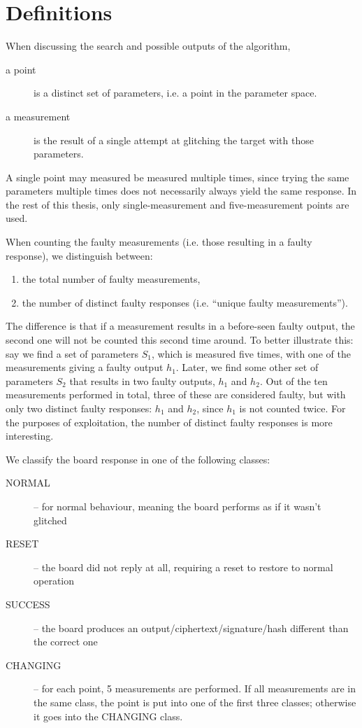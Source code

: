 \documentclass[times, utf8, diplomski]{fer}
\begin{document}
\section{Definitions}\label{sec:definitions}
When discussing the search and possible outputs of the algorithm,
\begin{description}
    \item[a point] is a distinct set of parameters, i.e. a point in the parameter space.
    \item[a measurement] is the result of a single attempt at glitching the target with those parameters.
\end{description}

A single point may measured be measured multiple times, since trying the same
parameters multiple times does not necessarily always yield the same response.
In the rest of this thesis, only single-measurement and five-measurement points
are used.

When counting the faulty measurements (i.e. those resulting in a faulty
response), we distinguish between:
\begin{enumerate}
    \item the total number of faulty measurements,
    \item the number of distinct faulty responses (i.e. ``unique faulty measurements'').
\end{enumerate}

The difference is that if a measurement results in a before-seen faulty output,
the second one will not be counted this second time around.
To better illustrate this: say we find a set of parameters $S_1$, which is
measured five times, with one of the measurements giving a faulty output $h_1$.
Later, we find some other set of parameters $S_2$ that results in two faulty
outputs, $h_1$ and $h_2$. Out of the ten measurements performed in total, three
of these are considered faulty, but with only two distinct faulty responses:
$h_1$ and $h_2$, since $h_1$ is not counted twice.
For the purposes of exploitation, the number of distinct faulty responses is
more interesting.

We classify the board response in one of the following classes:
\begin{description}
    \item[NORMAL]   -- for normal behaviour, meaning the board performs as if it wasn't glitched
    \item[RESET]    -- the board did not reply at all, requiring a reset to restore to normal operation
    \item[SUCCESS]  -- the board produces an output/ciphertext/signature/hash different than the correct one
    \item[CHANGING] -- for each point, 5 measurements are performed. If all measurements are in the
                       same class, the point is put into one of the first three classes; otherwise
                       it goes into the CHANGING class.
\end{description}
\end{document}
